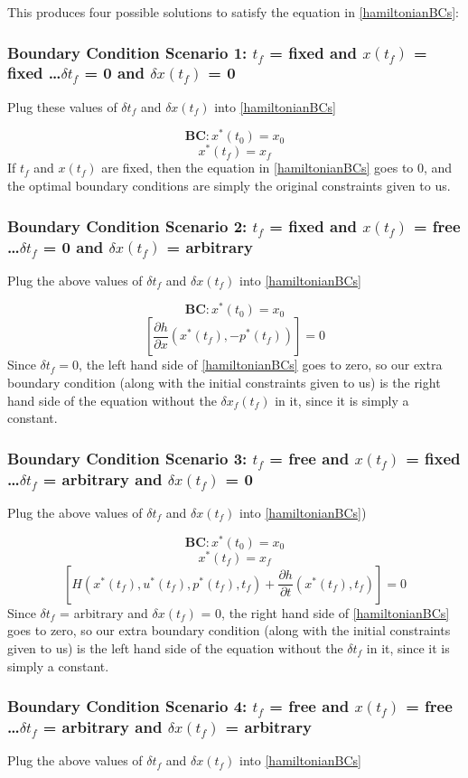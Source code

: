 ﻿\documentclass[twoside]{article}
\begin{document}
This produces four possible solutions to satisfy the equation in \ref{hamiltonianBCs}:
\subsubsection{Boundary Condition Scenario 1: $t_f$ = fixed and $x(t_f)$ = fixed \dots $\delta{t_f}$ = 0 and $\delta{x(t_f)}$ = 0}
Plug these values of $\delta{t_f}$ and $\delta{x(t_f)}$ into \ref{hamiltonianBCs}

$$\textbf{BC}: x^*(t_0) = x_0$$
$$x^*(t_f) = x_f$$
If $t_f$ and $x(t_f)$ are fixed, then the equation in \ref{hamiltonianBCs} goes to $0$, and the optimal boundary conditions are simply the original constraints given to us.


\subsubsection{Boundary Condition Scenario 2: $t_f$ = fixed and $x(t_f)$ = free \dots $\delta{t_f}$ = 0 and $\delta{x(t_f)}$ = arbitrary }
Plug the above values of $\delta{t_f}$ and $\delta{x(t_f)}$ into \ref{hamiltonianBCs}

$$\textbf{BC}: x^*(t_0) = x_0$$
$$[\frac{\partial{h}}{\partial{x}}(x^*(t_f), - p^*(t_f))] = 0$$
Since $\delta t_f = 0$, the left hand side of \ref{hamiltonianBCs} goes to zero, so our extra boundary condition (along with the initial constraints given to us) is the right hand side of the equation without the $\delta{x_f(t_f)}$ in it, since it is simply a constant. 
\subsubsection{Boundary Condition Scenario 3: $t_f$ = free and $x(t_f)$ = fixed \dots $\delta{t_f}$ = arbitrary and $\delta{x(t_f)}$ = 0  }
Plug the above values of $\delta{t_f}$ and $\delta{x(t_f)}$ into \ref{hamiltonianBCs})

$$\textbf{BC}: x^*(t_0) = x_0$$
$$x^*(t_f) = x_f$$
$$[H(x^*(t_f), u^*(t_f), p^*(t_f), t_f) + \frac{\partial{h}}{\partial{t}}(x^*(t_f), t_f)] = 0$$
Since $\delta{t_f}$ = arbitrary and $\delta{x(t_f)}$ = 0, the right hand side of \ref{hamiltonianBCs} goes to zero, so our extra boundary condition (along with the initial constraints given to us) is the left hand side of the equation without the $\delta{t_f}$ in it, since it is simply a constant.   
\subsubsection{Boundary Condition Scenario 4: $t_f$ = free and $x(t_f)$ = free \dots $\delta{t_f}$ = arbitrary and $\delta{x(t_f)}$ = arbitrary }
Plug the above values of $\delta{t_f}$ and $\delta{x(t_f)}$ into \ref{hamiltonianBCs}
\end{document}
